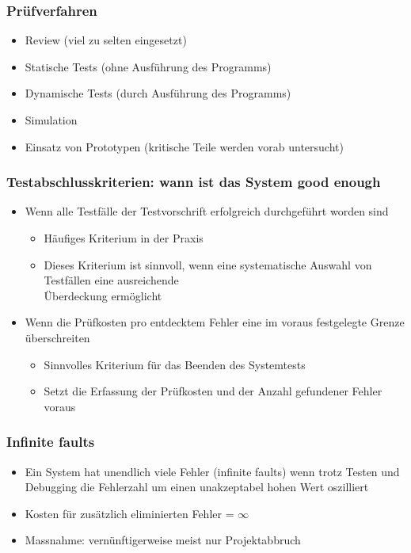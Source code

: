  \subsubsection{Prüfverfahren}
 \begin{itemize}
     \item Review (viel zu selten eingesetzt)
     \item Statische Tests (ohne Ausführung des Programms)
     \item Dynamische Tests (durch Ausführung des Programms)
     \item Simulation
     \item Einsatz von Prototypen (kritische Teile werden vorab untersucht)
 \end{itemize}
 
 \subsubsection{Testabschlusskriterien: wann ist das System good enough}
 \begin{itemize}
    \item Wenn alle Testfälle der Testvorschrift erfolgreich durchgeführt worden
sind
        \begin{itemize}
            \item Häufiges Kriterium in der Praxis
            \item Dieses Kriterium ist sinnvoll, wenn eine systematische Auswahl von Testfällen
eine ausreichende \\ Überdeckung ermöglicht
        \end{itemize}
    \item Wenn die Prüfkosten pro entdecktem Fehler eine im voraus festgelegte
Grenze überschreiten
        \begin{itemize}
            \item Sinnvolles Kriterium für das Beenden des Systemtests
            \item Setzt die Erfassung der Prüfkosten und der Anzahl gefundener Fehler voraus
        \end{itemize}
 \end{itemize}
 
 \subsubsection{Infinite faults}
 \begin{itemize}
     \item Ein System hat unendlich viele Fehler (infinite faults) wenn trotz Testen
und Debugging die Fehlerzahl um einen unakzeptabel hohen Wert oszilliert
    \item Kosten für zusätzlich eliminierten Fehler = $\infty$
    \item Massnahme: vernünftigerweise meist nur Projektabbruch
 \end{itemize}

